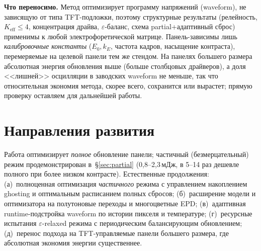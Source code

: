 \textbf{Что переносимо.} Метод оптимизирует программу напряжений (waveform),
не зависящую от типа TFT-подложки, поэтому структурные результаты (релейность,
$K_{\mathrm{eff}}\le4$, концентрация драйва, $\varepsilon$-баланс, схема
partial+адаптивный сброс) применимы к любой электрофоретической матрице.
Панель-зависимы лишь \emph{калибровочные константы} ($E_0,k_E$, частота кадров,
насыщение контраста), перемеряемые на целевой панели тем же стендом. На
панелях большего размера абсолютная энергия обновления выше (больше столбцовых
драйверов), а доля <<лишней>> осцилляции в заводских waveform не меньше, так что
относительная экономия метода, скорее всего, сохранится или вырастет; прямую
проверку оставляем для дальнейшей работы.

\section*{Направления развития}

Работа оптимизирует \emph{полное} обновление панели; частичный
(безмерцательный) режим продемонстрирован в~\S\ref{sec:partial} (0{,}8--2{,}3\,мДж,
в 5--14 раз дешевле полного при более низком контрасте). Естественные продолжения:
(а)~полноценная оптимизация \emph{частичного} режима с управлением накоплением
ghosting и оптимальным расписанием полных сбросов; (б)~расширение модели и оптимизатора на полутоновые
переходы и многоцветные EPD; (в)~адаптивная runtime-подстройка waveform по истории
пикселя и температуре; (г)~ресурсные испытания $\varepsilon$-relaxed режима с
периодическим балансирующим обновлением; (д)~перенос подхода на TFT-управляемые
панели большего размера, где абсолютная экономия энергии существеннее.
